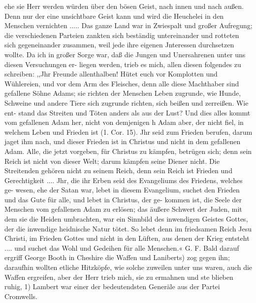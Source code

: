 ehe sie Herr werden würden über den bösen Geist, nach innen
und nach außen. Denn nur der eine unsichtbare Geist kann und
wird die Heuchelei in den Menschen vernichten .....
Das ganze Land war in Zwiespalt und großer Aufregung;
die verschiedenen Parteien zankten sich beständig untereinander
und rotteten sich gegeneinander zusammen, weil jede ihre eigenen
Jnteressen durchsetzen wollte. Da ich in großer Sorge war, daß
die Jungen und Unersahrenen unter uns diesen Versuchungen er-
liegen werden, trieb es mich, allen diesen folgendes zu schreiben:
,,Jhr Freunde allenthalben! Hütet euch vor Komplotten
und Wühlereien, und vor dem Arm des Fleisches, denn alle
diese Machthaber sind gefallene Söhne Adams; sie richten der
Menschen Leben zugrunde, wie Hunde, Schweine und andere
Tiere sich zugrunde richten, sich beißen und zerreißen. Wie ent-
stand das Streiten und Töten anders als aus der Lust? Und
dies alles kommt vom gefallenen Adam her, nicht von demjenigen h
Adam aber, der nicht fiel, in welchem Leben und Frieden ist
(1. Cor. 15). Jhr seid zum Frieden berufen, darum jaget ihm
nach, und dieser Frieden ist in Christus und nicht in dem gefallenen
Adam. Alle, die jetzt vorgeben, für Christus zu kämpfen, betrügen
sich; denn sein Reich ist nicht von dieser Welt; darum kämpfen
seine Diener nicht. Die Streitenden gehören nicht zu seinem
Reich, denn sein Reich ist Frieden und Gerechtigkeit .... Jhr,
die ihr Erben seid des Evangeliums des Friedens, welches ge-
wesen, ehe der Satan war, lebet in diesem Evangelium, suchet den
Frieden und das Gute für alle, und lebet in Christus, der ge-
kommen ist, die Seele der Menschen vom gefallenen Adam zu
erlösen; das äußere Schwert der Juden, mit dem sie die Heiden
umbrachten, war ein Sinnbild des inwendigen Geistes Gottes,
der die inwendige heidnische Natur tötet. So lebet denn im
friedsamen Reich Jesu Christi, im Frieden Gottes und nicht in
den Lüften, aus denen der Krieg entsteht .... und suchet das
Wohl und Gedeihen für alle Menschen.« G. F.
Bald darauf ergriff George Booth in Cheshire die Waffen
und Laniberts) zog gegen ihn; daraufhin wollten etliche Hitzköpfe,
wie solche zuweilen unter uns waren, auch die Waffen ergreifen,
aber der Herr trieb mich, sie zu ermahnen und ste blieben ruhig,
1) Lambert war einer der bedeutendsten Generäle aus der Partei Cromwells.


